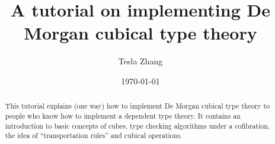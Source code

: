 \documentclass[reqno]{amsart}
\begin{document}
\title{A tutorial on implementing De Morgan cubical type theory}

\author{Tesla Zhang}
\address{The Pennsylvania State University}
\date\today


\begin{abstract}
This tutorial explains (one way) how to implement De Morgan cubical type theory
to people who know how to implement a dependent type theory. It contains an introduction
to basic concepts of cubes, type checking algorithms under a cofibration,
the idea of ``transportation rules'' and cubical operations.
\end{abstract}
\maketitle
\tableofcontents


\printbibliography
\end{document}
